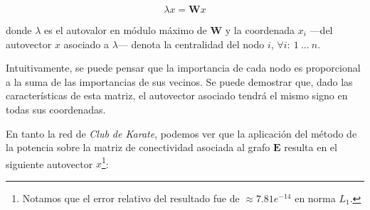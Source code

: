 \vspace{1em}
\begin{equation} \label{conectividad}
    \lambda x = \mathbf{W} x
\end{equation}

\vspace{1em}
\noindent donde $\lambda$ es el autovalor en módulo máximo de \textbf{W} y la coordenada $x_i$ ---del autovector $x$ asociado a $\lambda$--- denota la centralidad del nodo $i$, $\forall i:\ 1\ ...\ n$.

\vspace{1em}
Intuitivamente, se puede pensar que la importancia de cada nodo es proporcional a la suma de las importancias de sus vecinos. Se puede demostrar \cite{Newman} que, dado las características de esta matriz, el autovector asociado tendrá el mismo signo en todas sus coordenadas.

\vspace{1em}
En tanto la red de \textit{Club de Karate}, podemos ver que la aplicación del método de la potencia sobre la matriz de conectividad asociada al grafo $\mathbf{E}$ resulta en el siguiente autovector $x$\footnote{Notamos que el error relativo del resultado fue de $\approx 7.81e^{-14}$ en norma $L_1$.}:


